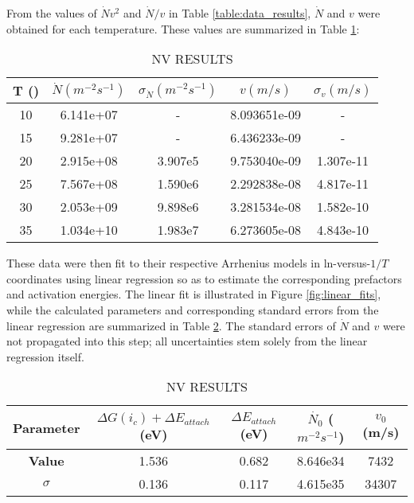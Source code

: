 From the values of $\dot{N}v^2$ and $\dot{N}/v$ in Table \ref{table:data_results}, $\dot{N}$ and $v$ were obtained for each temperature.  These values are summarized in Table \ref{table:nv_results}:

	\begin{table}[h!]
	\centering
	\begin{tabular}{|c c c c c |} 
	\hline
		T (\textdegree{C}) & $\dot{N}(m^{-2}s^{-1})$ & $\sigma_{\dot{N}}(m^{-2}s^{-1})$ & $v (m/s)$ & $\sigma_{v} (m/s)$ \\ 
	\hline
		10 & 6.141e+07 & - & 8.093651e-09 & -\\ 
		15 & 9.281e+07 & - & 6.436233e-09 & -\\
		20 & 2.915e+08 & 3.907e5 & 9.753040e-09 & 1.307e-11\\
		25 & 7.567e+08 & 1.590e6 & 2.292838e-08 & 4.817e-11\\
		30 & 2.053e+09 & 9.898e6 & 3.281534e-08 & 1.582e-10\\
		35 & 1.034e+10 & 1.983e7 & 6.273605e-08 & 4.843e-10\\
	\hline
	\end{tabular}
		\caption{NV RESULTS}
	\label{table:nv_results}
	\end{table}

These data were then fit to their respective Arrhenius models in ln-versus-$1/T$ coordinates using linear regression so as to estimate the corresponding prefactors and activation energies.  The linear fit is illustrated in Figure \ref{fig:linear_fits}, while the calculated parameters and corresponding standard errors from the linear regression are summarized in Table \ref{table:parameter_results}.  The standard errors of $\dot{N}$ and $v$ were not propagated into this step; all uncertainties stem solely from the linear regression itself.

	\begin{table}[h!]
	\centering
	\begin{tabular}{|c | c | c | c | c |} 
		\hline
		\textbf{Parameter} & $\Delta G(i_c) + \Delta E_{attach}$ (eV) & $\Delta E_{attach}$ (eV) & $\dot{N_0}$ ($m^{-2}s^{-1}$) & $v_0$ (m/s) \\ 
		\hline
		\textbf{Value} & 1.536 & 0.682 & 8.646e34 & 7432 \\
		\textbf{$\sigma$} & 0.136 & 0.117 & 4.615e35 & 34307 \\
		\hline
	\end{tabular}
		\caption{NV RESULTS}
	\label{table:parameter_results}
	\end{table}

